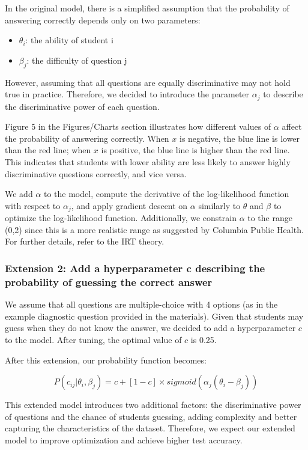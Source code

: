 \documentclass{article}
\begin{document}
In the original model, there is a simplified assumption that the probability of answering correctly depends only on two parameters:

\begin{itemize}
\item $\theta_i$: the ability of student i
\item $\beta_j$: the difficulty of question j
\end{itemize}

However, assuming that all questions are equally discriminative may not hold true in practice. Therefore, we decided to introduce the parameter $\alpha_j$ to describe the discriminative power of each question.

Figure 5 in the Figures/Charts section illustrates how different values of $\alpha$ affect the probability of answering correctly. When $x$ is negative, the blue line is lower than the red line; when $x$ is positive, the blue line is higher than the red line. This indicates that students with lower ability are less likely to answer highly discriminative questions correctly, and vice versa.

We add $\alpha$ to the model, compute the derivative of the log-likelihood function with respect to $\alpha_j$, and apply gradient descent on $\alpha$ similarly to $\theta$ and $\beta$ to optimize the log-likelihood function. Additionally, we constrain $\alpha$ to the range (0,2) since this is a more realistic range as suggested by Columbia Public Health. For further details, refer to the IRT theory.

\subsubsection{Extension 2: Add a hyperparameter c describing the probability of guessing the correct answer}

We assume that all questions are multiple-choice with 4 options (as in the example diagnostic question provided in the materials). Given that students may guess when they do not know the answer, we decided to add a hyperparameter $c$ to the model. After tuning, the optimal value of $c$ is 0.25.

After this extension, our probability function becomes:

\[P(c_{ij} | \theta_i, \beta_j) = c + [1 - c] \times sigmoid(\alpha_j(\theta_i - \beta_j))\]

This extended model introduces two additional factors: the discriminative power of questions and the chance of students guessing, adding complexity and better capturing the characteristics of the dataset. Therefore, we expect our extended model to improve optimization and achieve higher test accuracy.
\end{document}
